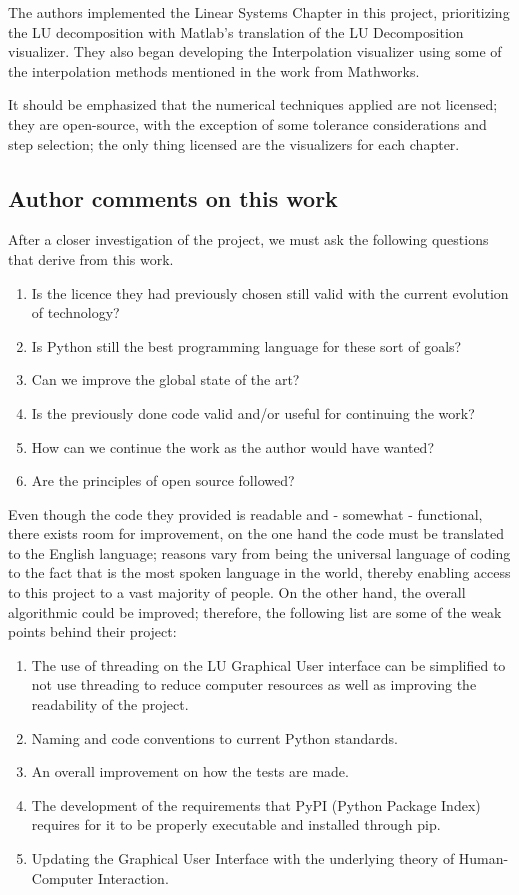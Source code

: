 The authors implemented the Linear Systems Chapter in this project, prioritizing the LU decomposition with Matlab's translation of the LU Decomposition visualizer. They also began developing the Interpolation visualizer using some of the interpolation methods mentioned in the work from Mathworks.

It should be emphasized that the numerical techniques applied are not licensed; they are open-source, with the exception of some tolerance considerations and step selection; the only thing licensed are the visualizers for each chapter.


\subsection{Author comments on this work}
After a closer investigation of the project, we must ask the following questions that derive from this work.
\begin{enumerate}
    \item Is the licence they had previously chosen still valid with the current evolution of technology?
    \item Is Python still the best programming language for these sort of goals?
    \item Can we improve the global state of the art?
    \item Is the previously done code valid and/or useful for continuing the work?
    \item How can we continue the work as the author would have wanted?
    \item Are the principles of open source followed?
\end{enumerate}

Even though the code they provided is readable and - somewhat - functional, there exists room for improvement, on the one hand the code must be translated to the English language; reasons vary from being the universal language of coding to the fact that is the most spoken language in the world, thereby enabling access to this project to a vast majority of people. On the other hand, the overall algorithmic could be improved; therefore, the following list are some of the weak points behind their project:

\begin{enumerate}
    \item The use of threading on the LU Graphical User interface can be simplified to not use threading to reduce computer resources as well as improving the readability of the project.
    \item Naming and code conventions to current Python standards.
    \item An overall improvement on how the tests are made.
    \item The development of the requirements that PyPI (Python Package Index) requires for it to be properly executable and installed through pip.
    \item Updating the Graphical User Interface with the underlying theory of Human-Computer Interaction.
\end{enumerate}

